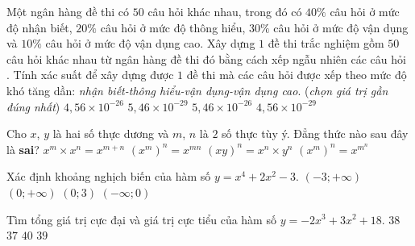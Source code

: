 \begin{ex}%
Một ngân hàng đề thi có $50$ câu hỏi khác nhau, trong đó có $40\%$ câu hỏi ở mức độ nhận biết, $20\%$ câu hỏi ở mức độ thông hiểu, $30\%$ câu hỏi ở mức độ vận dụng và $10\%$ câu hỏi ở mức độ vận dụng cao. Xây dựng $1$ đề thi trắc nghiệm gồm $50$ câu hỏi khác nhau từ ngân hàng đề thi đó bằng cách xếp ngẫu nhiên các câu hỏi . Tính xác suất để xây dựng được $1$ đề thi mà các câu hỏi được xếp theo mức độ khó tăng dần:\textit{ nhận biết-thông hiểu-vận dụng-vận dụng cao}. (\textit{chọn giá trị gần đúng nhất}) 
\choice
{\True $4,56\times 10^{-26}$}
{$5,46\times 10^{-29}$}
{$5,46\times 10^{-26}$}
{$4,56\times 10^{-29}$}
\end{ex}

\begin{ex}%
Cho $x$, $y$ là hai số thực dương và $m$, $n$ là $2$ số thực tùy ý. Đẳng thức nào sau đây là \textbf{sai}? 
\choice
{$x^m \times x^n = x^{m+n}$}
{$\left(x^m\right)^n = x^{mn}$}
{$(xy)^n = x^n \times y^n$}
{\True $\left(x^m\right)^n = x^{m^n}$}
\end{ex}

\begin{ex}%
Xác định khoảng nghịch biến của hàm số $y = x^4 + 2x^2 -3$.
\choice
{$(-3; +\infty)$}
{$(0; +\infty)$}
{$(0; 3)$}
{\True $(-\infty; 0)$}
\end{ex}

\begin{ex}%
Tìm tổng giá trị cực đại và giá trị cực tiểu của hàm số $y = -2x^3 + 3x^2 +18$.
\choice
{$38$}
{\True $37$}
{$40$}
{$39$}
\end{ex}

